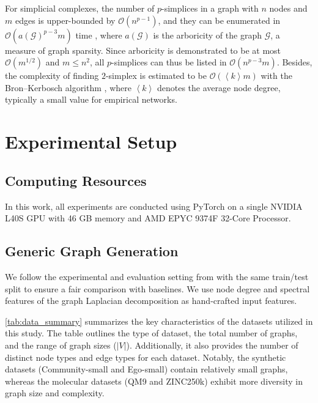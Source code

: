 For simplicial complexes, the number of $p$-simplices in a graph with $n$ nodes and $m$ edges is upper-bounded by $\mathcal{O}(n^{p-1})$, and they can be enumerated in $\mathcal{O}( a\left(\mathcal{G}\right)^{p-3} m)$ time \cite{chiba1985arboricity}, where $a\left(\mathcal{G}\right)$ is the arboricity of the graph $\mathcal{G}$, a measure of graph sparsity.
Since arboricity is demonstrated to be at most $\mathcal{O}(m^{1/2})$ and $m \leq n^2$, all $p$-simplices can thus be listed in $\mathcal{O}\left( n^{p-3} m \right)$.
Besides, the complexity of finding $2$-simplex is estimated to be $\mathcal{O}(\left\langle k \right\rangle m)$ with the Bron–Kerbosch algorithm \cite{find_cliques1973}, where $\left \langle k \right \rangle$ denotes the average node degree, typically a small value for empirical networks.


\section{Experimental Setup}
\label{app:exp_set}





\subsection{Computing Resources}
In this work, all experiments are conducted using PyTorch on a single NVIDIA L40S GPU with 46 GB memory and AMD EPYC 9374F 32-Core Processor.


\subsection{Generic Graph Generation}


We follow the experimental and evaluation setting from \citet{GDSS+ICML2022} with the same train/test split to ensure a fair comparison with baselines.
%
We use node degree and spectral features of the graph Laplacian decomposition as hand-crafted input features.

\cref{tab:data_summary} summarizes the key characteristics of the datasets utilized in this study. The table outlines the type of dataset, the total number of graphs, and the range of graph sizes ($|V|$). Additionally, it also provides the number of distinct node types and edge types for each dataset. Notably, the synthetic datasets (Community-small and Ego-small) contain relatively small graphs, whereas the molecular datasets (QM9 and ZINC250k) exhibit more diversity in graph size and complexity. %


